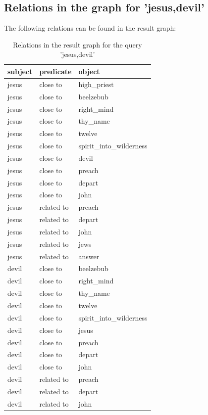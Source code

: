 \subsection{Relations in the graph for 'jesus,devil'}
The following relations can be found in the result graph:
\begin{table}[H]
\centering
    \begin{tabular}{|l|l|l|}
    \hline
    subject & predicate & object \\
    \hline
    jesus &close to& high\_priest \\
    jesus &close to& beelzebub \\
    jesus &close to& right\_mind \\
    jesus &close to& thy\_name\\
    jesus &close to& twelve \\
    \hline
    jesus &close to& spirit\_into\_wilderness\\
    jesus &close to& devil\\
    jesus &close to& preach\\
    jesus &close to& depart\\
    jesus &close to& john\\
    \hline
    jesus &related to & preach\\
    jesus &related to & depart\\
    jesus &related to & john\\
    jesus &related to & jews\\
    jesus &related to & answer\\
    \hline
    devil &close to& beelzebub \\
    devil &close to& right\_mind \\
    devil &close to& thy\_name \\
    devil &close to& twelve\\
    devil &close to& spirit\_into\_wilderness \\
    \hline
    devil &close to& jesus\\
    devil &close to& preach\\
    devil &close to& depart\\
    devil &close to& john\\
    \hline
    devil &related to & preach\\
    devil &related to & depart\\
    devil &related to & john\\
    \hline
\end{tabular}
\caption{Relations in the result graph for the query 'jesus,devil'}
\label{tab:relations_jesus,devil}
\end{table}

